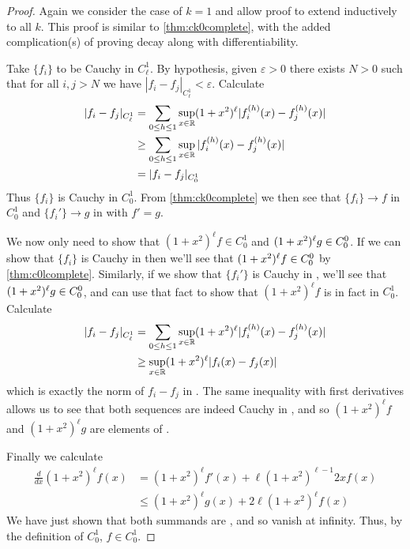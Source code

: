       \begin{proof}
        Again we consider the case of $k=1$ and allow proof to extend inductively to all $k$.
        This proof is similar to \cref{thm:ck0complete}, with the added complication(s) of proving decay along with differentiability.

        Take $\{f_i\}$ to be Cauchy in $C^1_\ell$.
        By hypothesis, given $\varepsilon>0$ there exists $N>0$ such that for all $i,j>N$ we have $|f_i -f_j|_{C^1_\ell} < \varepsilon$.
        Calculate
        \begin{align*}
          |f_i -f_j|_{C^1_\ell}
          &= \sum_{0\le h\le 1}\sup_{x\in\mathbb{R}}(1+x^2)^\ell|f_i^{(h)}(x)-f_j^{(h)}(x)|\\
          &\ge \sum_{0\le h\le 1}\sup_{x\in\mathbb{R}}|f_i^{(h)}(x)-f_j^{(h)}(x)|\\
          &= |f_i-f_j|_{C^1_0}
        \end{align*}
        Thus $\{f_i\}$ is Cauchy in $C^1_0$.
        From \cref{thm:ck0complete} we then see that $\{f_i\}\rightarrow f$ in $C^1_0$ and $\{f_i'\}\rightarrow g$ in \Coo with $f'=g$.

        We now only need to show that $(1+x^2)^\ell f\in C^1_0$ and $(1+x^2)^\ell g\in{C^0_0}$.
        If we can show that $\{f_i\}$ is Cauchy in \Cl then we'll see that $(1+x^2)^\ell f\in{C^0_0}$ by \cref{thm:c0lcomplete}.
        Similarly, if we show that $\{f_i'\}$ is Cauchy in \Cl, we'll see that $(1+x^2)^\ell g\in{C^0_0}$, and can use that fact to show that $(1+x^2)^\ell f$ is in fact in $C^1_0$.
        Calculate
        \begin{align*}
          |f_i -f_j|_{C^1_\ell}
          &= \sum_{0\le h\le 1}\sup_{x\in\mathbb{R}}(1+x^2)^\ell|f_i^{(h)}(x)-f_j^{(h)}(x)|\\
          &\ge \sup_{x\in\mathbb{R}}(1+x^2)^\ell|f_i(x)-f_j(x)|
        \end{align*}
        which is exactly the norm of $f_i-f_j$ in \Cl.
        The same inequality with first derivatives allows us to see that both sequences are indeed Cauchy in \Cl, and so $(1+x^2)^\ell f$ and $(1+x^2)^\ell g$ are elements of \Coo.

        Finally we calculate
        \begin{align*}
          \frac{d}{dx}(1+x^2)^\ell f(x)
          &= (1+x^2)^\ell f'(x) + \ell(1+x^2)^{\ell-1}2xf(x)\\
          &\le (1+x^2)^\ell g(x) + 2\ell(1+x^2)^\ell f(x)
        \end{align*}
        We have just shown that both summands are \Coo, and so vanish at infinity.
        Thus, by the definition of $C^1_0$, $f\in C^1_0$.


\end{proof}
